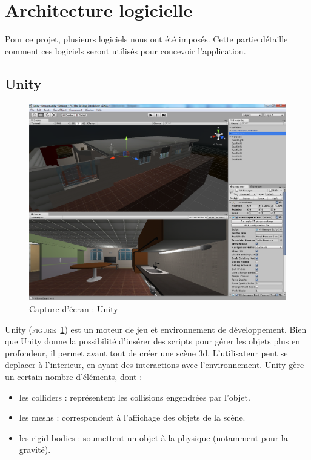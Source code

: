 \section{Architecture logicielle}
Pour ce projet, plusieurs logiciels nous ont été imposés. Cette partie détaille comment ces logiciels seront utilisés pour concevoir l'application.

\subsection{Unity}
\begin{figure}[h]
  \includegraphics[width=1\textwidth]{4-conception/img/unity_screenshot.png}
  \caption{Capture d'écran : Unity}
  \label{unity}
\end{figure}

Unity (\textsc{figure~\ref{unity}}) est un moteur de jeu et environnement de développement. Bien que Unity donne la possibilité d'insérer des scripts pour gérer les objets plus en profondeur, il permet avant tout de créer une scène 3d. L'utilisateur peut se deplacer à l'interieur, en ayant des interactions avec l'environnement. Unity gère un certain nombre d'éléments, dont :
\begin{itemize}
        \item les colliders : représentent les collisions engendrées par l'objet.
        \item les meshs : correspondent à l'affichage des objets de la scène.
        \item les rigid bodies : soumettent un objet à la physique (notamment pour la gravité).
\end{itemize}


